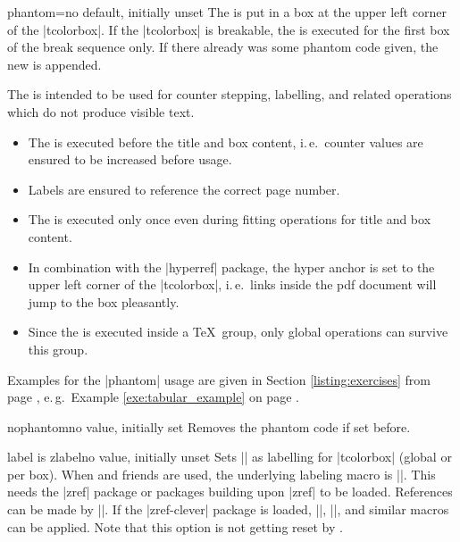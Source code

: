 \begin{docTcbKey}{phantom}{=}{no default, initially unset}
The  is put in a box at the upper left corner of the |tcolorbox|.
If the |tcolorbox| is breakable, the  is executed for the first box of
the break sequence only. If there already was some phantom code given, the
new  is appended.\par
The  is intended to be used for counter stepping, labelling, and
related operations which do not produce visible text.
\begin{itemize}
\item The  is executed before the title and box content, i.\,e.\ counter
  values are ensured to be increased before usage.
\item Labels are ensured to reference the correct page number.
\item The  is executed only once even during fitting operations for
  title and box content.
\item In combination with the |hyperref| package, the hyper anchor is set
  to the upper left corner of the |tcolorbox|, i.\,e.\ links inside the pdf document
  will jump to the box pleasantly.
\item Since the  is executed inside a \TeX\ group, only global
  operations can survive this group.
\end{itemize}
Examples for the |phantom| usage are given in Section \ref{listing:exercises}
from page \pageref{listing:exercises}, e.\,g.\
Example \ref{exe:tabular_example} on page \pageref{exe:tabular_example}.
\end{docTcbKey}

\begin{docTcbKey}{nophantom}{}{no value, initially set}
Removes the phantom code if set before.
\end{docTcbKey}




\begin{docTcbKey}[][doc new=2023-02-08]{label is zlabel}{}{no value, initially unset}
Sets |\zlabel| as labelling for |tcolorbox| (global or per box).
When \refKey{/tcb/label} and friends are used, the underlying labeling macro is |\zlabel|.
This needs the |zref| package \cite{oberdiek:zref} or packages building upon |zref| to be loaded.
References can be made by |\zref|. If the |zref-clever| package \cite{barros:zref-clever} is loaded,
|\zcref|, |\zcpageref|, and similar macros can be applied.
Note that this option is not getting reset by .
\end{docTcbKey}


